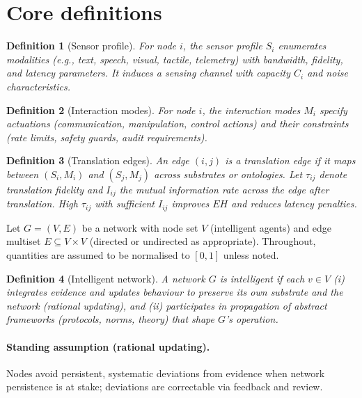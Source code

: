 \documentclass[12pt]{article}
\newtheorem{definition}{Definition}
\begin{document}
\section{Core definitions}
\begin{definition}[Sensor profile]\label{def:sensors}
For node $i$, the \emph{sensor profile} $S_i$ enumerates modalities (e.g., text, speech, visual, tactile, telemetry) with bandwidth, fidelity, and latency parameters. It induces a sensing channel with capacity $C_i$ and noise characteristics.
\end{definition}

\begin{definition}[Interaction modes]\label{def:modes}
For node $i$, the \emph{interaction modes} $M_i$ specify actuations (communication, manipulation, control actions) and their constraints (rate limits, safety guards, audit requirements).
\end{definition}

\begin{definition}[Translation edges]\label{def:translation}
An edge $(i,j)$ is a \emph{translation edge} if it maps between $(S_i,M_i)$ and $(S_j,M_j)$ across substrates or ontologies. Let $\tau_{ij}$ denote translation fidelity and $I_{ij}$ the mutual information rate across the edge after translation. High $\tau_{ij}$ with sufficient $I_{ij}$ improves $EH$ and reduces latency penalties.
\end{definition}

Let $G=(V,E)$ be a network with node set $V$ (intelligent agents) and edge multiset $E\subseteq V\times V$ (directed or undirected as appropriate). Throughout, quantities are assumed to be normalised to $[0,1]$ unless noted.

\begin{definition}[Intelligent network]\label{def:intnet}
A network $G$ is \emph{intelligent} if each $v\in V$ (i) integrates evidence and updates behaviour to preserve its own substrate and the network (rational updating), and (ii) participates in propagation of abstract frameworks (protocols, norms, theory) that shape $G$'s operation.
\end{definition}

\paragraph{Standing assumption (rational updating).}
Nodes avoid persistent, systematic deviations from evidence when network persistence is at stake; deviations are correctable via feedback and review.
\end{document}
